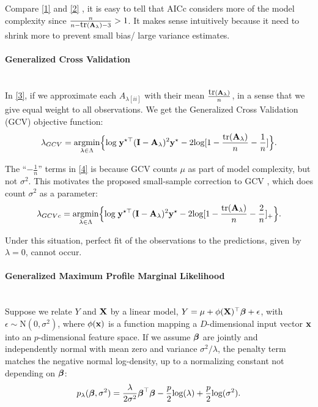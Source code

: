\documentclass[article]{jss}
\begin{document}
Compare \eqref{1}  and \eqref{2} , it is easy to tell that AICc considers more of the model complexity since $\frac{n}{n-\mbox{tr}({\bf A}_\lambda)-3}>1$. It makes sense intuitively because it need to shrink more to prevent small bias/ large variance estimates.

\paragraph{Generalized Cross Validation}\mbox{}\\
In \eqref{3}, if we approximate each $A_{\lambda[ii]}$ with their mean $\frac{\mbox{tr}({\bf A}_\lambda)}{n}$, in a sense that we give equal weight to all observations. We get the Generalized Cross Validation (GCV) objective function:
\begin{align}
\lambda_{GCV}=\underset{\lambda \in \Lambda}{\mbox{argmin}}\Big\{\mbox{log}\; {\bf y}^{\star \top}({\bf I}-{\bf A}_\lambda)^2{\bf y}^\star-2\mbox{log}[1-\frac{\mbox{tr}({\bf A}_\lambda)}{n}-\frac{1}{n}]\Big\}. \label{4}
\end{align}

The ``$-\frac{1}{n}$'' terms in \eqref{4} is because GCV counts $\mu$ as part of model complexity, but not $\sigma^2$. This motivates the proposed small-sample correction to GCV \citep{boonstra_small-sample_2015}, which does count $\sigma^2$ as a parameter:
\begin{align}
\lambda_{GCVc}=\underset{\lambda \in \Lambda}{\mbox{argmin}}\Big\{\mbox{log}\; {\bf y}^{\star \top}({\bf I}-{\bf A}_\lambda)^2{\bf y}^\star-2\mbox{log}[1-\frac{\mbox{tr}({\bf A}_\lambda)}{n}-\frac{2}{n}]_+\Big\}.
\end{align}

Under this situation, perfect fit of the observations to the predictions, given by $\lambda=0$, cannot occur.


\paragraph{Generalized Maximum Profile Marginal Likelihood}\mbox{}\\
Suppose we relate $Y$ and ${\bf X}$ by a linear model, $Y=\mu+\phi({\bf X})^\top \boldsymbol{\beta}+\epsilon$, with $\epsilon \sim \mathrm{N}(0, \sigma^2)$, where $\phi({\bf x})$ is a function mapping a $D$-dimensional input vector ${\bf x}$ into an $p$-dimensional feature space. If we assume $\boldsymbol{\beta}$ are jointly and independently normal with mean zero and variance $\sigma^2/\lambda$, the penalty term matches the negative normal log-density, up to a normalizing constant not depending on $\boldsymbol{\beta}$:
\begin{align*}
p_\lambda(\boldsymbol{\beta}, \sigma^2)=\frac{\lambda}{2\sigma^2}\boldsymbol{\beta}^\top\boldsymbol{\beta}-\frac{p}{2}\mbox{log}(\lambda)+\frac{p}{2}\mbox{log}(\sigma^2).
\end{align*}
\end{document}
